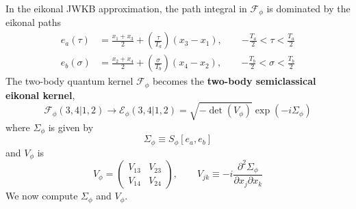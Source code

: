 In the eikonal JWKB approximation, the path integral in $\mathcal{F}_{\phi}$ is dominated by the eikonal paths
\begin{equation}
\begin{split}
	e_{a}(\tau) &= \frac{x_{1} + x_{3}}{2} + \left( \frac{\tau}{T_{a}} \right) (x_{3} - x_{1}), \qquad {- \frac{T_{a}}{2} < \tau < \frac{T_{a}}{2} } \\
	e_{b}(\sigma) &= \frac{x_{2} + x_{4}}{2} + \left( \frac{\sigma}{T_{b}} \right) (x_{4} - x_{2}), \qquad {- \frac{T_{b}}{2} < \sigma < \frac{T_{b}}{2} }
\end{split} \label{eikConf2}
\end{equation}
The two-body quantum kernel $\mathcal{F}_{\phi}$ becomes the \textbf{two-body semiclassical eikonal kernel},
\begin{equation}
	\mathcal{F}_{\phi}(3,4|1,2) \longrightarrow \mathcal{E}_{\phi}(3,4|
1,2) = \sqrt{-\det{(V_{\phi})}} \exp{\left( - i \Sigma_{\phi} \right)}
\end{equation}
where $\Sigma_{\phi}$ is given by
\begin{equation}
	\Sigma_{\phi} \equiv S_{\phi} \left[ e_{a}, e_{b} \right]
\end{equation}
and $V_{\phi}$ is
\begin{equation}
	V_{\phi} = \begin{pmatrix}
	V_{13} & V_{23} \\
	V_{14} & V_{24}
	\end{pmatrix}, \qquad V_{jk} \equiv -i \frac{\partial^{2} \Sigma_{\phi}}{\partial x_{j} \partial x_{k}}
\end{equation}
We now compute $\Sigma_{\phi}$ and $V_{\phi}$.
